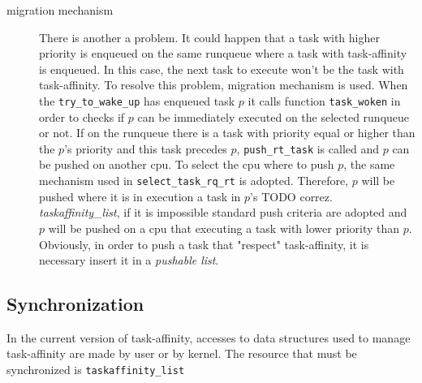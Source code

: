 \begin{description}
\item[migration mechanism] There is another a problem. It could happen that a task with higher priority is enqueued on the same runqueue where a task with 
task-affinity is enqueued. In this case, the next task to execute won't be the task with task-affinity.
To resolve this problem, migration mechanism is used. When the \texttt{try\_to\_wake\_up} has enqueued task $p$ it calls function \texttt{task\_woken} in 
order to checks if $p$ can be immediately executed on the selected runqueue or not. If on the runqueue there is a task with priority equal or higher than 
the $p$'s priority and this task precedes $p$, \texttt{push\_rt\_task} is called and $p$ can be pushed on another cpu. To select the cpu where to push $p$, 
the same mechanism used in \texttt{select\_task\_rq\_rt} is adopted. Therefore, $p$ will be pushed where it is in execution a task in $p$'s TODO correz. 
\textit{taskaffinity\_list}, if it is impossible standard push criteria are adopted and $p$ will be pushed on a cpu that executing a task with lower 
priority than $p$. Obviously, in order to push a task that "respect" task-affinity, it is necessary insert it in a \textit{pushable list}. 

\end{description}
\subsection{Synchronization}

In the current version of task-affinity, accesses to data structures used to manage task-affinity are made by user or by kernel. The resource that must be
synchronized is \texttt{taskaffinity\_list}

